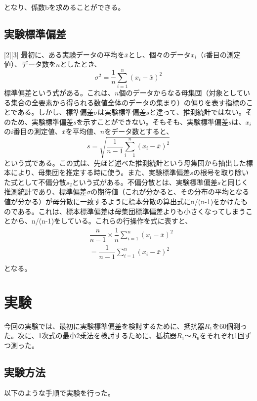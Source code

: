 \documentclass[10pt,a4paper]{jsarticle}
\numberwithin{equation}{section}
\numberwithin{figure}{section}
\numberwithin{table}{section}
\begin{document}
  となり、係数bを求めることができる。
  \subsection{実験標準偏差}[2][3]
  最初に、ある実験データの平均を$\bar{x}$とし、個々のデータ$x_i$（$i$番目の測定値）、データ数を$n$としたとき、
  \begin{equation}
    \sigma^2 = \dfrac{1}{n} \sum_{i=1}^{n} (x_i - \bar{x})^2 \label{標準偏差}
  \end{equation}
  標準偏差という式がある。これは、$n$個のデータからなる母集団（対象としている集合の全要素から得られる数値全体のデータの集まり）の偏りを表す指標のことである。しかし、標準偏差$\si{\sigma}$は実験標準偏差$s$と違って、推測統計ではない。そのため、実験標準偏差$s$を示すことができない。そもそも、実験標準偏差$s$は、$x_i$の$i$番目の測定値、$\bar{x}$を平均値、$n$をデータ数とすると、
  \begin{equation}
    s = \sqrt{\dfrac{1}{n-1}\sum_{i=1}^{n} (x_i-\bar{x})^2}
  \end{equation}
  という式である。この式は、先ほど述べた推測統計という母集団から抽出した標本により、母集団を推定する時に使う。また、実験標準偏差$s$の根号を取り除いた式として不偏分散$s_2$という式がある。不偏分散とは、実験標準偏差$s$と同じく推測統計であり、標準偏差$\si{\sigma}$の期待値（これが分かると、その分布の平均となる値が分かる）が母分散に一致するように標本分散の算出式にn/(n-1)をかけたものである。これは、標本標準偏差は母集団標準偏差よりも小さくなってしまうことから、n/(n-1)をしている。これらの行操作を式に表すと、
  \begin{equation}
    \begin{split}
      &\dfrac{n}{n-1} \times \dfrac{1}{n} \sum_{i=1}^{n} (x_i - \bar{x})^2\\
      &=\dfrac{1}{n-1}\sum_{i=1}^{n} (x_i-\bar{x})^2\\
    \end{split}
  \end{equation}
  となる。

  \section{実験}
  今回の実験では、最初に実験標準偏差を検討するために、抵抗器$R_1$を60個測った。次に、1次式の最小2乗法を検討するために、抵抗器$R_1～R_6$をそれぞれ1回ずつ測った。
    \subsection{実験方法}
    以下のような手順で実験を行った。
\end{document}
